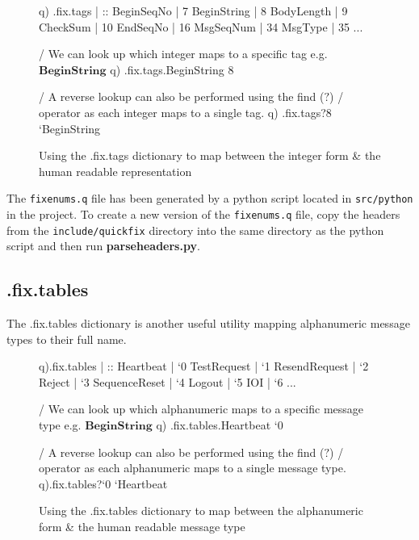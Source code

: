 \begin{figure}[H]
\begin{qcode}
q) .fix.tags
               | ::
BeginSeqNo     | 7
BeginString    | 8
BodyLength     | 9
CheckSum       | 10
EndSeqNo       | 16
MsgSeqNum      | 34
MsgType        | 35
...

/ We can look up which integer maps to a specific tag e.g. $\textbf{BeginString}$
q) .fix.tags.BeginString
8

/ A reverse lookup can also be performed using the find ($\textbf{?}$) 
/ operator as each integer maps to a single tag.
q) .fix.tags?8
`BeginString
\end{qcode}
\caption{Using the .fix.tags dictionary to map between the integer form \& the human readable representation}
\label{fig:tags}
\end{figure}

The \verb|fixenums.q| file has been generated by a python script located in
\verb|src/python| in the project. To create a new version of the \verb|fixenums.q| file, copy the headers from the \verb|include/quickfix| directory into the same
directory as the python script and then run \textbf{parseheaders.py}.


\subsection{.fix.tables}

The .fix.tables dictionary is another useful utility mapping alphanumeric message types to their full name. 

\begin{figure}[H]
\begin{qcode}
q).fix.tables
| ::
Heartbeat                 | `0
TestRequest               | `1
ResendRequest             | `2
Reject                    | `3
SequenceReset             | `4
Logout                    | `5
IOI                       | `6
...

/ We can look up which alphanumeric maps to a specific message type e.g. $\textbf{BeginString}$
q) .fix.tables.Heartbeat
`0

/ A reverse lookup can also be performed using the find ($\textbf{?}$) 
/ operator as each alphanumeric maps to a single message type.
q).fix.tables?`0
`Heartbeat
\end{qcode}
\caption{Using the .fix.tables dictionary to map between the alphanumeric form \& the human readable message type}
\label{fig:tables}
\end{figure}